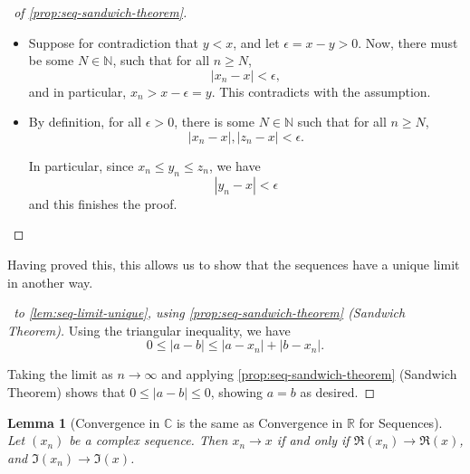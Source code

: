 \documentclass[11pt]{article}
\numberwithin{equation}{section}
\newtheorem{lemma}[theorem]{Lemma}
\theoremstyle{definition}
\theoremstyle{remark}
\newcommand{\pqty}[1]{\left(#1\right)}
\newcommand{\abs}[1]{\left|#1\right|}
\newcommand{\RR}{\mathbb R}
\newcommand{\CC}{\mathbb C}
\newcommand{\NN}{\mathbb N}
\begin{document}
\begin{proof}[\proofname\ of \autoref{prop:seq-sandwich-theorem}]
    \begin{itemize}
        \item Suppose for contradiction that \(y < x\), and let \(\epsilon = x - y > 0\). Now, there must be some \(N \in \NN\), such that for all \(n \geq N\),
        \[
            \abs{x_n - x} < \epsilon,
        \]
        and in particular, \(x_n > x - \epsilon = y\). This contradicts with the assumption.

        \item By definition, for all \(\epsilon > 0\), there is some \(N \in \NN\) such that for all \(n \geq N\),
        \[
            \abs{x_n - x}, \abs{z_n - x} < \epsilon.
        \]

        In particular, since \(x_n \leq y_n \leq z_n\), we have
        \[
            \abs{y_n - x} < \epsilon
        \]
        and this finishes the proof.
    \end{itemize}
\end{proof}

Having proved this, this allows us to show that the sequences have a unique limit in another way.

\begin{proof}[\proofname\ to \autoref{lem:seq-limit-unique}, using \autoref{prop:seq-sandwich-theorem} (Sandwich Theorem)]
    Using the triangular inequality, we have
    \[
        0 \leq \abs{a - b} \leq \abs{a - x_n} + \abs{b - x_n}.
    \]

    Taking the limit as \(n \to \infty\) and applying \autoref{prop:seq-sandwich-theorem} (Sandwich Theorem) shows that \(0 \leq \abs{a - b} \leq 0\), showing \(a = b\) as desired.
\end{proof}

\begin{lemma}[Convergence in \(\CC\) is the same as Convergence in \(\RR\) for Sequences]\label{analysis-unit-0010}
    \label{lem:seq-convergence-in-c}%
    Let \(\pqty{x_n}\) be a complex sequence. Then \(x_n \to x\) if and only if \(\Re\pqty{x_n} \to \Re\pqty{x}\), and \(\Im \pqty{x_n} \to \Im\pqty{x}\).
\end{lemma}
\end{document}
